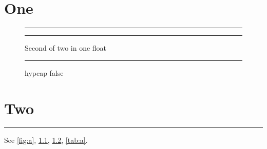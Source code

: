 \documentclass{book}
\begin{document}
\listoffigures
\chapter{One}
\begin{figure}[htbp]
\centering
\begin{minipage}{.45\linewidth}\centering\rule{2cm}{1cm}\caption{First of two in one float}\label{fig:a}\end{minipage}\hfill
\begin{minipage}{.45\linewidth}\centering\rule{2cm}{1cm}\caption{Second of two in one float}\label{fig:b}\end{minipage}
\end{figure}
\begin{figure}[htbp]
\captionsetup{hypcap=false}
\centering\rule{3cm}{1cm}
\caption{hypcap false}\label{fig:c}
\end{figure}
\chapter{Two}
\begin{table}[htbp]
\caption{Table in chapter two}\label{tab:a}
\centering\rule{3cm}{1cm}
\end{table}
See \ref{fig:a}, \ref{fig:b}, \ref{fig:c}, \autoref{tab:a}.
\end{document}
